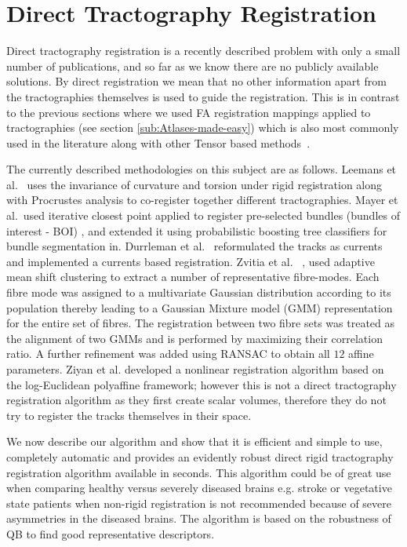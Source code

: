\documentclass[preprint,authoryear,a4paper,10pt,onecolumn]{elsarticle}
\begin{document}
\section{Direct Tractography Registration}

Direct tractography registration is a recently described problem with
only a small number of publications, and so far as we know there are no
publicly available solutions. By direct registration we mean that no
other information apart from the tractographies themselves is used to
guide the registration. This is in contrast to the previous sections
where we used FA registration mappings applied to tractographies (see
section \ref{sub:Atlases-made-easy}) which is also most commonly used in
the literature along with other Tensor based
methods~\cite{goh2006algebraic}.

The currently described methodologies on this subject are as follows.
Leemans et al.~\cite{leemans2006multiscale} uses the invariance of
curvature and torsion under rigid registration along with Procrustes
analysis to co-register together different tractographies. Mayer et
al.~used iterative closest point applied to register pre-selected
bundles (bundles of interest - BOI) \cite{mayer2008bundles},
\cite{mayerdirect} and extended it using probabilistic boosting tree
classifiers for bundle segmentation
in\cite{mayer2011supervised}. Durrleman et
al.~\cite{durrleman2010registration} reformulated the tracks as currents
and implemented a currents based registration. Zvitia et
al.~\cite{zvitia2008adaptive} \cite{Zvitia2010}, used adaptive mean
shift clustering to extract a number of representative
fi{}bre-modes. Each fibre mode was assigned to a multivariate Gaussian
distribution according to its population thereby leading to a Gaussian
Mixture model (GMM) representation for the entire set of fibres. The
registration between two fibre sets was treated as the alignment of two
GMMs and is performed by maximizing their correlation ratio. A further
refinement was added using RANSAC\cite{fischler1981random} to obtain all
$12$ affine parameters. Ziyan et al.\cite{ZiyanMICCAI07} developed a
nonlinear registration algorithm based on the log-Euclidean polyaffine
framework\cite{Arsigny2009}; however this is not a direct tractography
registration algorithm as they first create scalar volumes, therefore
they do not try to register the tracks themselves in their space.

We now describe our algorithm and show that it is efficient and simple
to use, completely automatic and provides an evidently robust direct
rigid tractography registration algorithm available in seconds. This
algorithm could be of great use when comparing healthy versus severely
diseased brains e.g. stroke or vegetative state patients when non-rigid
registration is not recommended because of severe asymmetries in the
diseased brains. The algorithm is based on the robustness of QB to find
good representative descriptors.
\end{document}
